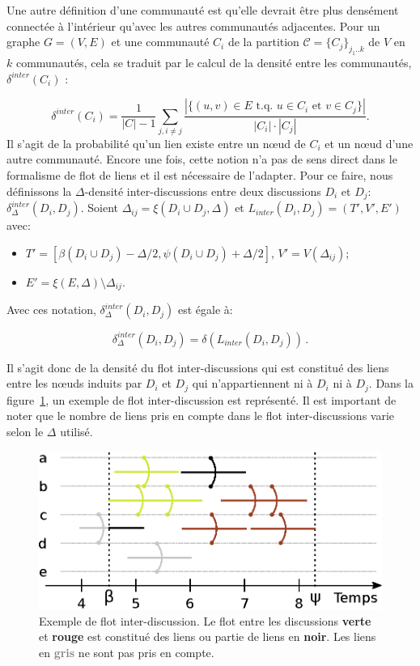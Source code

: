 Une autre définition d'une communauté est qu'elle devrait être plus densément connectée à l'intérieur qu'avec les autres communautés adjacentes.
Pour un graphe $G=(V,E)$ et une communauté $C_i$ de la partition $\mathcal{C} = \{C_j\}_{j_1..k}$ de $V$ en $k$ communautés, cela se traduit par le calcul de la densité entre les communautés, $\delta^{inter}(C_i)$ :

\begin{equation}
	\delta^{inter}(C_i) = \frac{1}{|C|-1}\sum_{j, i\ne j}\frac{|\{(u,v)\in E\mbox{ t.q. }u\in C_i\mbox{ et }v\in C_j\}|}{|C_i|\cdot |C_j|}.
\end{equation}
Il s'agit de la probabilité qu'un lien existe entre un n\oe{}ud de $C_i$ et un n\oe{}ud d'une autre communauté.
Encore une fois, cette notion n'a pas de sens direct dans le formalisme de flot de liens et il est nécessaire de l'adapter.
Pour ce faire, nous définissons la $\Delta$-densité inter-discussions entre deux discussions $D_i$ et $D_j$: $\delta^{inter}_{\Delta}(D_i,D_j)$.
Soient $\Delta_{ij}=\xi(D_i \cup D_j,\Delta)$ et $L_{inter}(D_i, D_j) = (T',V',E')$ avec:

\begin{itemize}
\item  $T'=[\beta(D_i \cup D_j) - \Delta/2,\psi(D_i \cup D_j) + \Delta/2]$, $V'= V(\Delta_{ij})$;
\item  $E' = \xi(E,\Delta) \setminus \Delta_{ij}$.
\end{itemize}
Avec ces notation, $\delta^{inter}_{\Delta}(D_i,D_j)$ est égale à:

\begin{equation}
 \delta^{inter}_{\Delta}(D_i,D_j) = \delta(L_{inter}(D_i, D_j))\, .
\end{equation}

Il s'agit donc de la densité du flot inter-discussions qui est constitué des liens entre les n\oe{}uds induits par $D_i$ et $D_j$ qui n'appartiennent ni à $D_i$ ni à $D_j$.
Dans la figure~\ref{fig:inter_dens_discussion_ex}, un exemple de flot inter-discussion est représenté.
Il est important de noter que le nombre de liens pris en compte dans le flot inter-discussions varie selon le $\Delta$ utilisé.

\begin{figure}
\centering
	\includegraphics[width=0.65\linewidth]{img/mailing/inter_flot.eps}
\caption{Exemple de flot inter-discussion.
Le flot entre les discussions \textcolor{olivegreen}{\textbf{verte}} et \textcolor{briquered}{\textbf{rouge}} est constitué des liens ou partie de liens en \textbf{noir}. Les liens en \textcolor{gray}{\textbf{gris}} ne sont pas pris en compte.}
\label{fig:inter_dens_discussion_ex}
\end{figure}



